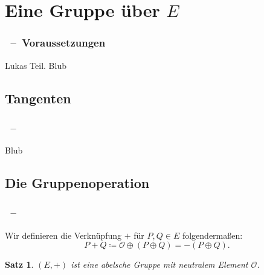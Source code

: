 \documentclass{beamer}
\theoremstyle{plain}
\newtheorem{thm}{Satz}[section]
\theoremstyle{definition}
\theoremstyle{rem}
\newcommand{\patinf}{\mathcal{O}}
\begin{document}
\section{Eine Gruppe über $E$} 

\begin{frame}
\frametitle{\insertsection~--~Voraussetzungen}
Lukas Teil. Blub
\end{frame}

\subsection{Tangenten}

\begin{frame}
\frametitle{\insertsection~--~\insertsubsection}
Blub
\end{frame}

\subsection{Die Gruppenoperation}

\begin{frame}
\frametitle{\insertsection~--~\insertsubsection}
Wir definieren die Verknüpfung $+$ für $P, Q \in E$ folgendermaßen:
\begin{equation*} \label{plus-op}
    P + Q \coloneqq \patinf \oplus (P \oplus Q) = -(P \oplus Q).
\end{equation*}
\begin{thm}
    $(E, +)$ ist eine abelsche Gruppe mit neutralem Element $\patinf$.
\end{thm}
\end{frame}

\end{document}
